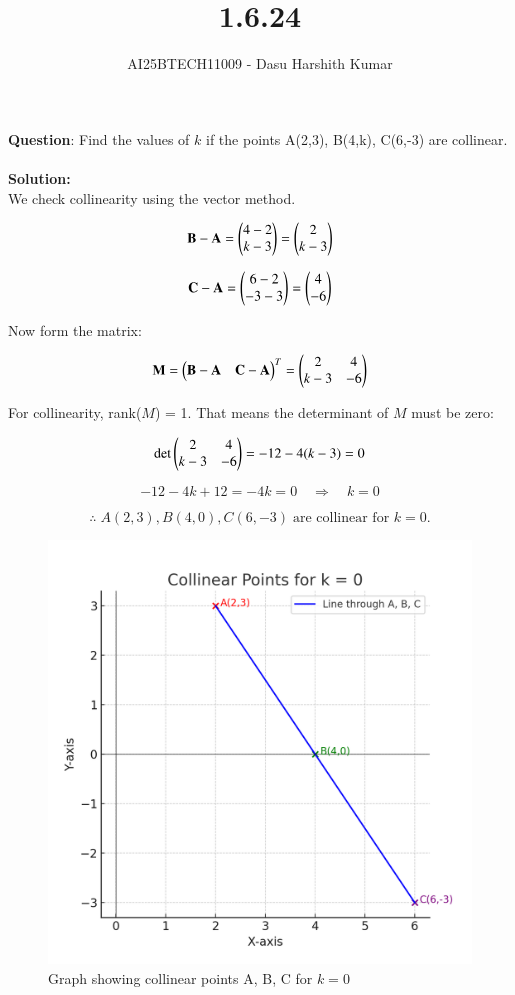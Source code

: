 \documentclass[journal]{IEEEtran}
\begin{document}

\vspace{3cm}

\title{1.6.24}
\author{AI25BTECH11009 - Dasu Harshith Kumar}
{\let\newpage\relax\maketitle}

\renewcommand{\thefigure}{\theenumi}
\renewcommand{\thetable}{\theenumi}
\setlength{\intextsep}{10pt} 

\renewcommand{\thetable}{\theenumi}

\textbf{Question}: Find the values of \(k\) if the points  
A(2,3), B(4,k), C(6,-3) are collinear.\\\\

\textbf{Solution:}\\

We check collinearity using the vector method.  

\[
\mathbf{B}-\mathbf{A} = \begin{pmatrix}4-2 \\ k-3\end{pmatrix} = \begin{pmatrix}2 \\ k-3\end{pmatrix}
\]

\[
\mathbf{C}-\mathbf{A} = \begin{pmatrix}6-2 \\ -3-3\end{pmatrix} = \begin{pmatrix}4 \\ -6\end{pmatrix}
\]

Now form the matrix:  

\[
\mathbf{M} = \begin{pmatrix}\mathbf{B}-\mathbf{A} & \mathbf{C}-\mathbf{A}\end{pmatrix}^T
= \begin{pmatrix}2 & 4 \\ k-3 & -6\end{pmatrix}
\]

For collinearity, rank(\(M\)) = 1.  
That means the determinant of \(M\) must be zero:

\[
\det \begin{pmatrix}2 & 4 \\ k-3 & -6\end{pmatrix} = -12 -4(k-3) = 0
\]

\[
-12 -4k + 12 = -4k = 0 \quad \Rightarrow \quad k = 0
\]

\[
\therefore \; A(2,3), B(4,0), C(6,-3) \; \text{are collinear for } k=0.
\]

\begin{figure}[htbp]
    \centering
    \includegraphics[width=0.8\linewidth]{figs/image.jpg}
    \caption{Graph showing collinear points A, B, C for \(k=0\)}
    \label{fig:fig1}
\end{figure}
\end{document}
